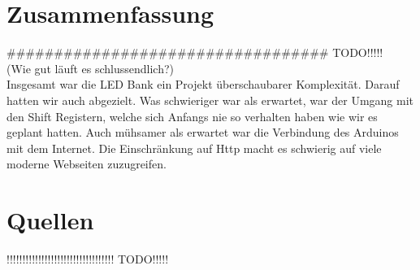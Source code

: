\documentclass[10pt,a4paper]{article}
\begin{document}
\section{Zusammenfassung}

################################## TODO!!!!!\\
(Wie gut läuft es schlussendlich?)\\

Insgesamt war die LED Bank ein Projekt überschaubarer Komplexität. Darauf hatten wir auch abgezielt. Was schwieriger war als erwartet, war der Umgang mit den Shift Registern, welche sich Anfangs nie so verhalten haben wie wir es geplant hatten. Auch mühsamer als erwartet war die Verbindung des Arduinos mit dem Internet. Die Einschränkung auf Http macht es schwierig auf viele moderne Webseiten zuzugreifen.\\

\section{Quellen}

!!!!!!!!!!!!!!!!!!!!!!!!!!!!!!!!!! TODO!!!!!\\
\end{document}
